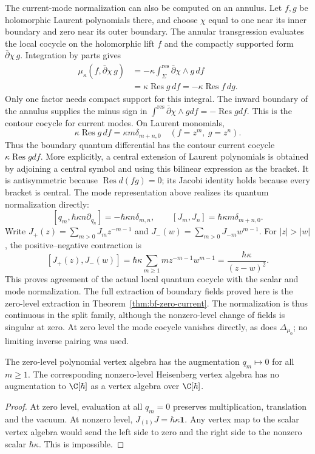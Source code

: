 The current-mode normalization can also be computed on an annulus.
Let $f,g$ be holomorphic Laurent polynomials there, and choose $\chi$
equal to one near its inner boundary and zero near its outer boundary.
The annular transgression evaluates the local cocycle on the
holomorphic lift $f$ and the compactly supported form
$\bar\partial\chi\,g$.  Integration by parts gives
\[
 \begin{split}
 \mu_\kappa(f,\bar\partial\chi\,g)
 &=-\kappa\int_\Sigma^{\mathrm{res}}
                      \bar\partial\chi\wedge g\,df\\
 &=\kappa\operatorname{Res}g\,df
 =-\kappa\operatorname{Res}f\,dg.
 \end{split}
\]
Only one factor needs compact support for this integral.
The inward boundary of the annulus supplies the minus sign in
$\int^{\mathrm{res}}\bar\partial\chi\wedge gdf=-\operatorname{Res}gdf$.
This is the contour cocycle for current modes.  On Laurent monomials,
\[
 \kappa\operatorname{Res}g\,df
       =\kappa m\delta_{m+n,0}\quad(f=z^m,\ g=z^n).
\]
Thus the boundary quantum differential has the contour current
cocycle $\kappa\operatorname{Res}gdf$.  More explicitly, a central
extension of Laurent polynomials is obtained by adjoining a central
symbol and using this bilinear expression as the bracket.  It is
antisymmetric because $\operatorname{Res}d(fg)=0$; its Jacobi identity
holds because every bracket is central.  The mode representation
above realizes its quantum normalization directly:
\[
 [q_m,\hbar\kappa n\partial_{q_n}]
      =-\hbar\kappa n\delta_{m,n},\qquad
 [J_m,J_n]=\hbar\kappa m\delta_{m+n,0}.
\]
Write
$J_+(z)=\sum_{m>0}J_mz^{-m-1}$ and
$J_-(w)=\sum_{m>0}J_{-m}w^{m-1}$.
For $|z|>|w|$, the positive--negative contraction is
\[
 [J_+(z),J_-(w)]
 =\hbar\kappa\sum_{m\ge1}m z^{-m-1}w^{m-1}
 =\frac{\hbar\kappa}{(z-w)^2}.
\]
This proves agreement of the actual local quantum cocycle with the
scalar and mode normalization.  The full extraction of boundary
fields proved here is the zero-level extraction in
Theorem~\ref{thm:bf-zero-current}.
The normalization is thus continuous in the split family, although
the nonzero-level change of fields is singular at zero.
At zero level the mode cocycle vanishes directly, as does
$\Delta_{\mu_0}$; no limiting inverse pairing was used.

\begin{corollary}
The zero-level polynomial vertex algebra has the augmentation
$q_m\mapsto0$ for all $m\ge1$.  The corresponding nonzero-level
Heisenberg vertex algebra has no augmentation to
$\C[\hbar]$ as a vertex algebra over $\C[\hbar]$.
\end{corollary}
\begin{proof}
At zero level, evaluation at all $q_m=0$ preserves multiplication,
translation and the vacuum.  At nonzero level,
$J_{(1)}J=\hbar\kappa\mathbf1$.  Any vertex map to the scalar vertex
algebra would send the left side to zero and the right side to the
nonzero scalar $\hbar\kappa$.  This is impossible.
\end{proof}

